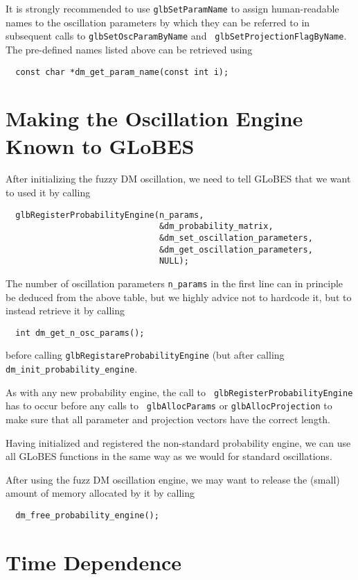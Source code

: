 \documentclass{scrartcl}
\begin{document}
\noindent
It is strongly recommended to use {\tt glbSetParamName} to assign human-readable
names to the oscillation parameters by which they can be referred to in
subsequent calls to {\tt glbSetOscParamByName} and {\tt
glbSetProjectionFlagByName}.  The pre-defined names listed above can be retrieved
using
\begin{verbatim}
  const char *dm_get_param_name(const int i);
\end{verbatim}


\section{Making the Oscillation Engine Known to GLoBES}

After initializing the fuzzy DM oscillation, we need to tell GLoBES that we want to
used it by calling
\begin{verbatim}
  glbRegisterProbabilityEngine(n_params,
                               &dm_probability_matrix,
                               &dm_set_oscillation_parameters,
                               &dm_get_oscillation_parameters,
                               NULL);
\end{verbatim}
The number of oscillation parameters {\tt n_params} in the first line can in principle
be deduced from the above table, but we highly advice not to hardcode it, but
to instead retrieve it by calling
\begin{verbatim}
  int dm_get_n_osc_params();
\end{verbatim}
before calling {\tt glbRegistareProbabilityEngine} (but after calling
{\tt dm_init_probability_engine}.

As with any new probability engine, the call to {\tt
glbRegisterProbabilityEngine} has to occur before any calls to {\tt
glbAllocParams} or {\tt glbAllocProjection} to make sure that all parameter and
projection vectors have the correct length.

Having initialized and registered the non-standard probability engine, we can
use all GLoBES functions in the same way as we would for standard
oscillations.

After using the fuzz DM oscillation engine, we may want to release the
(small) amount of memory allocated by it by calling
\begin{verbatim}
  dm_free_probability_engine();
\end{verbatim}


\section{Time Dependence}
\end{document}
